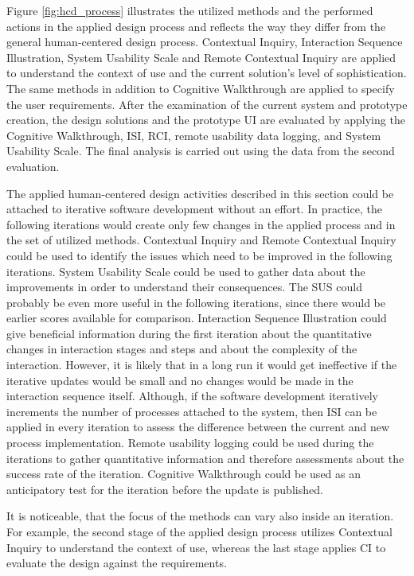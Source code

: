 \documentclass[12pt,a4paper,oneside,pdftex]{report}
\begin{document}
Figure \ref{fig:hcd_process} illustrates the utilized methods and the performed actions in the applied design process and reflects the way they differ from the general human-centered design process. Contextual Inquiry, Interaction Sequence Illustration, System Usability Scale and Remote Contextual Inquiry are applied to understand the context of use and the current solution's level of sophistication. The same methods in addition to Cognitive Walkthrough are applied to specify the user requirements. After the examination of the current system and prototype creation, the design solutions and the prototype UI are evaluated by applying the Cognitive Walkthrough, ISI, RCI, remote usability data logging, and System Usability Scale. The final analysis is carried out using the data from the second evaluation.  

The applied human-centered design activities described in this section could be attached to iterative software development without an effort. In practice, the following iterations would create only few changes in the applied process and in the set of utilized methods. Contextual Inquiry and Remote Contextual Inquiry could be used to identify the issues which need to be improved in the following iterations. System Usability Scale could be used to gather data about the improvements in order to understand their consequences. The SUS could probably be even more useful in the following iterations, since there would be earlier scores available for comparison. Interaction Sequence Illustration could give beneficial information during the first iteration about the quantitative changes in interaction stages and steps and about the complexity of the interaction. However, it is likely that in a long run it would get ineffective if the iterative updates would be small and no changes would be made in the interaction sequence itself. Although, if the software development iteratively increments the number of processes attached to the system, then ISI can be applied in every iteration to assess the difference between the current and new process implementation. Remote usability logging could be used during the iterations to gather quantitative information and therefore assessments about the success rate of the iteration. Cognitive Walkthrough could be used as an anticipatory test for the iteration before the update is published. 

It is noticeable, that the focus of the methods can vary also inside an iteration. For example, the second stage of the applied design process utilizes Contextual Inquiry to understand the context of use, whereas the last stage applies CI to evaluate the design against the requirements. 
\end{document}

